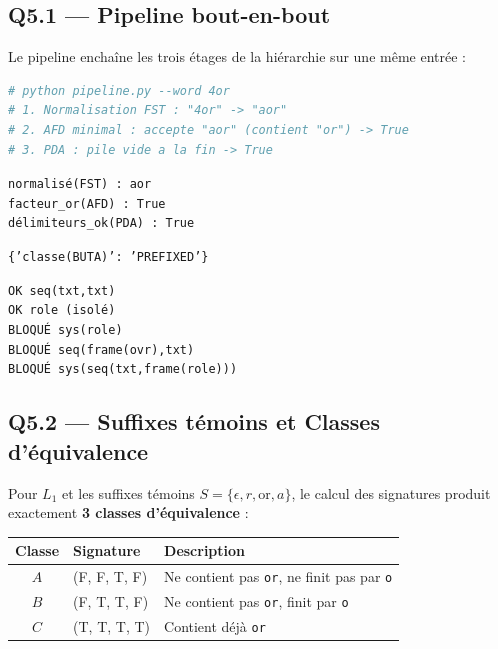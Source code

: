 \documentclass[12pt,a4paper,oneside]{scrartcl}
\begin{document}
\subsection{Q5.1 — Pipeline bout-en-bout}

Le pipeline enchaîne les trois étages de la hiérarchie sur une même entrée :

\begin{lstlisting}[language=Python]
# python pipeline.py --word 4or
# 1. Normalisation FST : "4or" -> "aor"
# 2. AFD minimal : accepte "aor" (contient "or") -> True
# 3. PDA : pile vide a la fin -> True
\end{lstlisting}

\begin{tracebox}
\texttt{normalisé(FST) : aor} \\
\texttt{facteur\_or(AFD) : True} \\
\texttt{délimiteurs\_ok(PDA) : True}
\end{tracebox}

\begin{tracebox}
\texttt{\{'classe(BUTA)': 'PREFIXED'\}}
\end{tracebox}

\begin{tracebox}
\texttt{OK \quad seq(txt,txt)} \\
\texttt{OK \quad role (isolé)} \\
\texttt{BLOQUÉ \quad sys(role)} \\
\texttt{BLOQUÉ \quad seq(frame(ovr),txt)} \\
\texttt{BLOQUÉ \quad sys(seq(txt,frame(role)))}
\end{tracebox}

\subsection{Q5.2 — Suffixes témoins et Classes d'équivalence}

Pour $L_1$ et les suffixes témoins $S = \{\epsilon, r, \text{or}, a\}$, le calcul des signatures produit exactement \textbf{3 classes d'équivalence} :

\begin{center}
\begin{tabular}{c l l}
    \toprule
    \textbf{Classe} & \textbf{Signature} & \textbf{Description} \\
    \midrule
    $A$ & (F, F, T, F) & Ne contient pas \texttt{or}, ne finit pas par \texttt{o} \\
    $B$ & (F, T, T, F) & Ne contient pas \texttt{or}, finit par \texttt{o} \\
    $C$ & (T, T, T, T) & Contient déjà \texttt{or} \\
    \bottomrule
\end{tabular}
\end{center}
\end{document}
